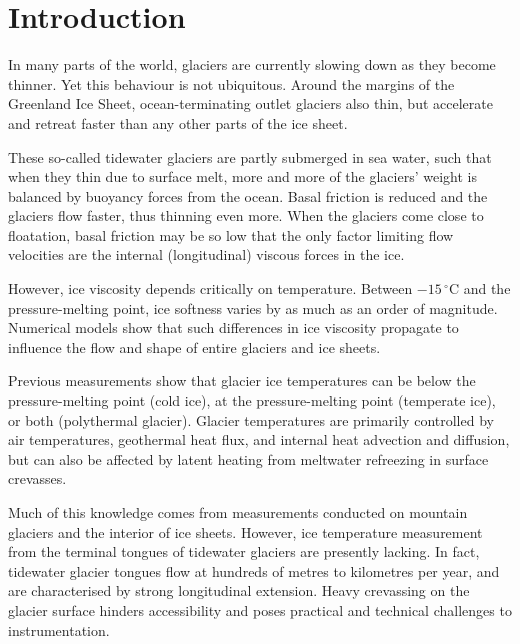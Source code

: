 \documentclass[utf8]{article}
\begin{document}
\section{Introduction}

    In many parts of the world, glaciers are currently slowing down as they
    become thinner. Yet this behaviour is not ubiquitous. Around the margins of
    the Greenland Ice Sheet, ocean-terminating outlet glaciers also thin, but
    accelerate and retreat faster than any other parts of the ice sheet.

    These so-called tidewater glaciers are partly submerged in sea water, such
    that when they thin due to surface melt, more and more of the glaciers'
    weight is balanced by buoyancy forces from the ocean. Basal friction is
    reduced and the glaciers flow faster, thus thinning even more. When the
    glaciers come close to floatation, basal friction may be so low that the
    only factor limiting flow velocities are the internal (longitudinal)
    viscous forces in the ice.

    However, ice viscosity depends critically on temperature. Between
    $-15\,^\circ$C and the pressure-melting point, ice softness varies by as
    much as an order of magnitude. Numerical models show that such differences
    in ice viscosity propagate to influence the flow and shape of entire
    glaciers and ice sheets.

    Previous measurements show that glacier ice temperatures can be below
    the pressure-melting point (cold ice), at the pressure-melting point
    (temperate ice), or both (polythermal glacier). Glacier temperatures are
    primarily controlled by air temperatures, geothermal heat flux, and
    internal heat advection and diffusion, but can also be affected by latent
    heating from meltwater refreezing in surface crevasses.

    Much of this knowledge comes from measurements conducted on mountain
    glaciers and the interior of ice sheets. However, ice temperature
    measurement from the terminal tongues of tidewater glaciers are presently
    lacking. In fact, tidewater glacier tongues flow at hundreds of metres to
    kilometres per year, and are characterised by strong longitudinal
    extension. Heavy crevassing on the glacier surface hinders accessibility
    and poses practical and technical challenges to instrumentation.
\end{document}
